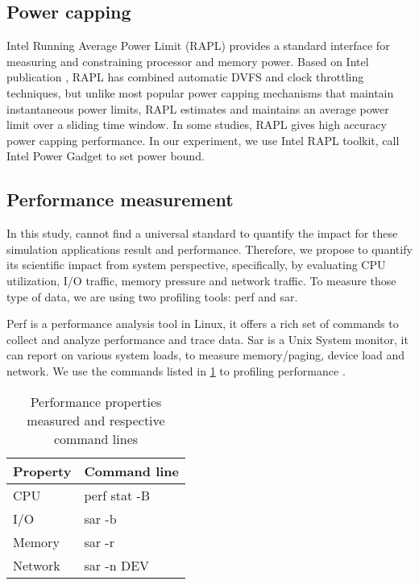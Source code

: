 \subsection{Power capping}
Intel Running Average Power Limit (RAPL) provides a standard interface for measuring and constraining processor and memory power. Based on Intel publication \cite{david2010rapl}, RAPL has combined automatic DVFS and clock throttling techniques, but unlike most popular power capping mechanisms that maintain instantaneous power limits, RAPL estimates and maintains an average power limit over a sliding time window. In some studies\cite{rountree2012beyond,sarood2013optimizing}, RAPL gives high accuracy power capping performance. In our experiment, we use Intel RAPL toolkit, call Intel Power Gadget to set power bound.


\subsection{Performance measurement}
In this study, cannot find a universal standard to quantify the impact for these simulation applications result and performance. Therefore, we propose to quantify its scientific impact from system perspective, specifically, by evaluating CPU utilization, I/O traffic, memory pressure and network traffic. To measure those type of data, we are using two profiling tools: perf and sar. 

Perf is a performance analysis tool in Linux, it offers a rich set of commands to collect and analyze performance and trace data. Sar is a Unix System monitor, it can report on various system loads, to measure memory/paging, device load and network. We use the commands listed in  \ref{table:performance properties} to profiling performance .


\begin{table}[H]
\begin{center}
\begin{tabular}{|l|l|}
	\hline
	\textbf{Property} & \textbf{Command line}\\ \hline
    CPU & perf stat -B\\ 		\hline
    I/O & sar -b\\				\hline
    Memory & sar -r\\			\hline
    Network & sar -n DEV\\      \hline
\end{tabular}
\caption{Performance properties measured and respective command lines }
\label{table:performance properties}
\end{center}
\end{table}



